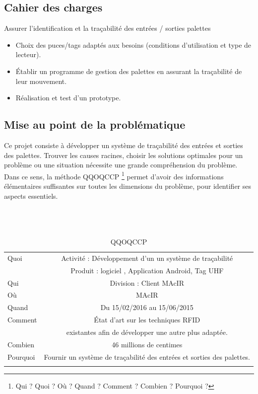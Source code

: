 \documentclass[11pt, a4paper, twoside]{book}
\begin{document}
\subsection{Cahier des charges}
Assurer l’identification et la traçabilité des entrées / sorties palettes
\begin{itemize}
\item Choix des puces/tags adaptés aux besoins (conditions d’utilisation et type de lecteur).
\item Établir un programme de gestion des palettes en assurant la traçabilité de leur mouvement.
\item Réalisation et test d’un prototype.\\
\end{itemize}
\subsection{Mise au point de la problématique}
Ce projet consiste à développer un système de traçabilité des entrées et sorties des palettes. Trouver les causes racines, choisir les solutions optimales pour un problème ou une situation nécessite une grande compréhension du problème. Dans ce sens, la méthode QQOQCCP \footnote{Qui ? Quoi ? Où ? Quand ? Comment ? Combien ? Pourquoi ?} permet d'avoir des informations élémentaires suffisantes sur toutes les dimensions du problème, pour identifier ses aspects essentiels.\\\\\\\
        
\begin{longtable}{|l|c|}
  \hline
  Quoi & Activité : Développement d’un un système de traçabilité \\
       &  Produit : logiciel , Application Android, Tag UHF \\
  \hline
  Qui & Division : Client MAcIR\\
  \hline
  Où & MAcIR\\
  \hline
  Quand & Du 15/02/2016 au 15/06/2015\\
  \hline
  Comment & État d’art sur les techniques RFID \\
          &  existantes afin de développer une autre plus adaptée.\\
   \hline
  Combien & 46 millions de centimes\\
  \hline
  Pourquoi & Fournir un système de traçabilité des entrées et sorties des palettes.\\
  \hline
  
\caption{QQOQCCP}
\end{longtable}
\end{document}
